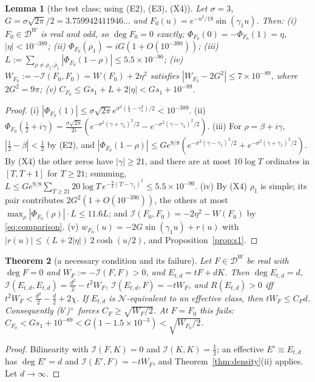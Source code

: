 \documentclass[11pt]{amsart}
\newtheorem{theorem}{Theorem}[section]
\newtheorem{lemma}[theorem]{Lemma}
\theoremstyle{definition}
\theoremstyle{remark}
\newcommand{\DW}{\mathcal D^{W}}
\newcommand{\Nr}{\mathcal N}
\newcommand{\I}{\mathcal I}
\newcommand{\dg}{\deg}
\begin{document}
\begin{lemma}[the test class; using (E2), (E3), (X4)]\label{lem:F0}
Let $\sigma=3$, $G=\sigma\sqrt{2\pi}/2=3.759942411946\ldots$ and $F_0(u)=e^{-u^2/18}\sin(\gamma_1u)$. Then:
(i) $F_0\in\DW$ is real and odd, so $\dg F_0=0$ exactly; $\Phi_{F_0}(0)=-\Phi_{F_0}(1)=\eta$, $|\eta|<10^{-389}$;
(ii) $\Phi_{F_0}(\rho_1)=iG(1+O(10^{-390}))$;
(iii) $L:=\sum_{\rho\ne\rho_1,\bar\rho_1}|\Phi_{F_0}(1-\rho)|\le5.5\times10^{-90}$;
(iv) $W_{F_0}:=-\I(F_0,F_0)=W(F_0)+2\eta^2$ satisfies $|W_{F_0}-2G^2|\le7\times10^{-89}$, where $2G^2=9\pi$;
(v) $C_{F_0}\le Gs_1+L+2|\eta|<Gs_1+10^{-89}$.
\end{lemma}
\begin{proof}
(i) $|\Phi_{F_0}(1)|\le\sigma\sqrt{2\pi}e^{\sigma^2(\frac14-\gamma_1^2)/2}<10^{-389}$. (ii)
$\Phi_{F_0}(\frac12+i\gamma)=\frac{\sigma\sqrt{2\pi}}{2i}(e^{-\sigma^2(\gamma+\gamma_1)^2/2}-e^{-\sigma^2(\gamma-\gamma_1)^2/2})$.
(iii) For $\rho=\beta+i\gamma$, $|\frac12-\beta|<\frac12$ by (E2), and
$|\Phi_{F_0}(1-\rho)|\le Ge^{9/8}(e^{-\sigma^2(\gamma-\gamma_1)^2/2}+e^{-\sigma^2(\gamma+\gamma_1)^2/2})$. By (X4) the other
zeros have $|\gamma|\ge21$, and there are at most $10\log T$ ordinates in $[T,T+1]$ for $T\ge21$; summing,
$L\le Ge^{9/8}\sum_{T\ge21}20\log T\,e^{-\frac92(T-\gamma_1)^2}\le5.5\times10^{-90}$.
(iv) By (X4) $\rho_1$ is simple; its pair contributes $2G^2(1+O(10^{-390}))$, the others at most
$\max_\rho|\Phi_{F_0}(\rho)|\cdot L\le11.6L$; and $\I(F_0,F_0)=-2\eta^2-W(F_0)$ by \eqref{eq:comparison}.
(v) $w_{F_0}(u)=-2G\sin(\gamma_1u)+r(u)$ with $|r(u)|\le(L+2|\eta|)\,2\cosh(u/2)$, and Proposition~\ref{prop:s1}.
\end{proof}

\begin{theorem}[a necessary condition and its failure]\label{thm:C41}
Let $F\in\DW$ be real with $\dg F=0$ and $W_F:=-\I(F,F)>0$, and $E_{t,d}=tF+dK$. Then $\dg E_{t,d}=d$,
$\I(E_{t,d},E_{t,d})=\frac{d^2}2-t^2W_F$, $\I(E_{t,d},F)=-tW_F$, and $R(E_{t,d})>0$ iff
$t^2W_F<\frac{d^2}2-\frac d2+2\chi$. If $E_{t,d}$ is $\Nr$-equivalent to an effective class, then
$tW_F\le C_Fd$. Consequently (b$'$)$^+$ forces $C_F\ge\sqrt{W_F/2}$. At $F=F_0$ this fails:
$C_{F_0}<Gs_1+10^{-89}<G(1-1.5\times10^{-3})<\sqrt{W_{F_0}/2}$.
\end{theorem}
\begin{proof}
Bilinearity with $\I(F,K)=0$ and $\I(K,K)=\frac12$; an effective $E'\equiv E_{t,d}$ has $\dg E'=d$ and
$\I(E',F)=-tW_F$, and Theorem~\ref{thm:density}(ii) applies. Let $d\to\infty$.
\end{proof}
\end{document}
